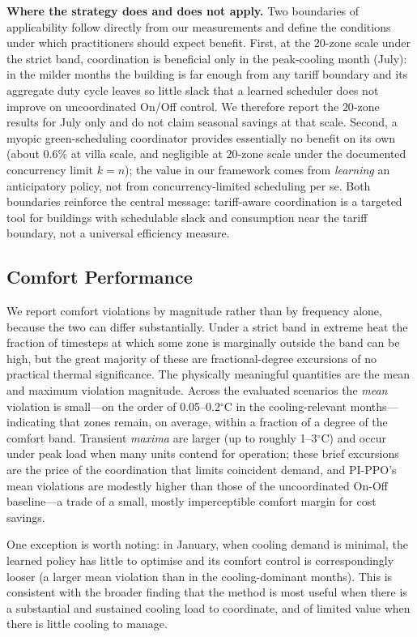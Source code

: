 \documentclass[12pt,a4paper]{article}
\begin{document}
\textbf{Where the strategy does and does not apply.} Two boundaries of applicability follow directly from our measurements and define the conditions under which practitioners should expect benefit. First, at the $20$-zone scale under the strict band, coordination is beneficial only in the peak-cooling month (July): in the milder months the building is far enough from any tariff boundary and its aggregate duty cycle leaves so little slack that a learned scheduler does not improve on uncoordinated On/Off control. We therefore report the $20$-zone results for July only and do not claim seasonal savings at that scale. Second, a myopic green-scheduling coordinator provides essentially no benefit on its own (about $0.6\%$ at villa scale, and negligible at $20$-zone scale under the documented concurrency limit $k=n$); the value in our framework comes from \emph{learning} an anticipatory policy, not from concurrency-limited scheduling per se. Both boundaries reinforce the central message: tariff-aware coordination is a targeted tool for buildings with schedulable slack and consumption near the tariff boundary, not a universal efficiency measure.

\subsection{Comfort Performance}
\label{sec:comfort}

We report comfort violations by magnitude rather than by frequency alone, because the two can differ substantially. Under a strict band in extreme heat the fraction of timesteps at which some zone is marginally outside the band can be high, but the great majority of these are fractional-degree excursions of no practical thermal significance. The physically meaningful quantities are the mean and maximum violation magnitude. Across the evaluated scenarios the \emph{mean} violation is small---on the order of 0.05--0.2$^\circ$C in the cooling-relevant months---indicating that zones remain, on average, within a fraction of a degree of the comfort band. Transient \emph{maxima} are larger (up to roughly 1--3$^\circ$C) and occur under peak load when many units contend for operation; these brief excursions are the price of the coordination that limits coincident demand, and PI-PPO's mean violations are modestly higher than those of the uncoordinated On-Off baseline---a trade of a small, mostly imperceptible comfort margin for cost savings.

One exception is worth noting: in January, when cooling demand is minimal, the learned policy has little to optimise and its comfort control is correspondingly looser (a larger mean violation than in the cooling-dominant months). This is consistent with the broader finding that the method is most useful when there is a substantial and sustained cooling load to coordinate, and of limited value when there is little cooling to manage.
\end{document}
